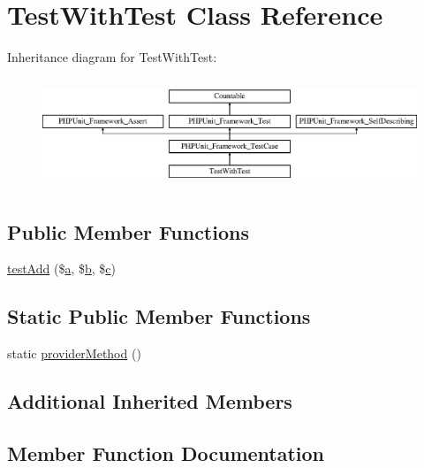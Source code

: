 \hypertarget{class_test_with_test}{}\section{Test\+With\+Test Class Reference}
\label{class_test_with_test}
Inheritance diagram for Test\+With\+Test\+:\begin{figure}[H]
\begin{center}
\leavevmode
\includegraphics[height=3.303835cm]{class_test_with_test}
\end{center}
\end{figure}
\subsection*{Public Member Functions}
\begin{DoxyCompactItemize}
\item 
\mbox{\hyperlink{class_test_with_test_aee936425adb92ab632ef751353789f64}{test\+Add}} (\$\mbox{\hyperlink{interfacea}{a}}, \$\mbox{\hyperlink{interfaceb}{b}}, \$\mbox{\hyperlink{classc}{c}})
\end{DoxyCompactItemize}
\subsection*{Static Public Member Functions}
\begin{DoxyCompactItemize}
\item 
static \mbox{\hyperlink{class_test_with_test_aa41ff734aa7d002dc2a7a32a9e35b499}{provider\+Method}} ()
\end{DoxyCompactItemize}
\subsection*{Additional Inherited Members}


\subsection{Member Function Documentation}
\mbox{\label{class_test_with_test_aa41ff734aa7d002dc2a7a32a9e35b499}} 
